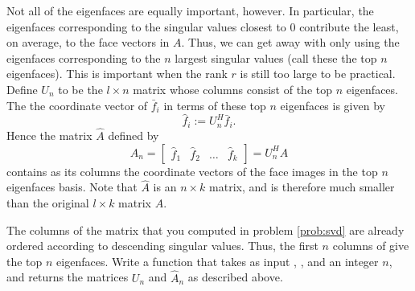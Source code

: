 Not all of the eigenfaces are equally important, however.
In particular, the eigenfaces corresponding to the singular values closest to 0 contribute the least, on average, to the face vectors in $A$.
Thus, we can get away with only using the eigenfaces corresponding to the $n$ largest singular values (call these the top $n$ eigenfaces).
This is important when the rank $r$ is still too large to be practical.
Define $U_n$ to be the $l \times n$ matrix whose columns consist of the top $n$ eigenfaces.
The the coordinate vector of $\bar{f}_i$ in terms of these top $n$ eigenfaces is given by
\[
\hat{f}_i := U_n^H\bar{f}_i.
\]
Hence the matrix $\hat{A}$ defined by
\[
\hat{A}_n = \begin{bmatrix}
\hat{f}_1 & \hat{f}_2 & \ldots & \hat{f}_k
\end{bmatrix}
= U_n^HA
\]
contains as its columns the coordinate vectors of the face images in the top $n$ eigenfaces basis.
Note that $\hat{A}$ is an $n \times k$ matrix, and is therefore much smaller than the original $l \times k$ matrix $A$.
\begin{problem}
\label{prob:top_n}
The columns of the matrix  that you computed in problem \ref{prob:svd} are already ordered according to descending singular values.
Thus, the first $n$ columns of  give the top $n$ eigenfaces.
Write a function  that takes as input , , and an integer $n$, and returns the matrices $U_n$ and $\hat{A}_n$ as described above.
\end{problem}
